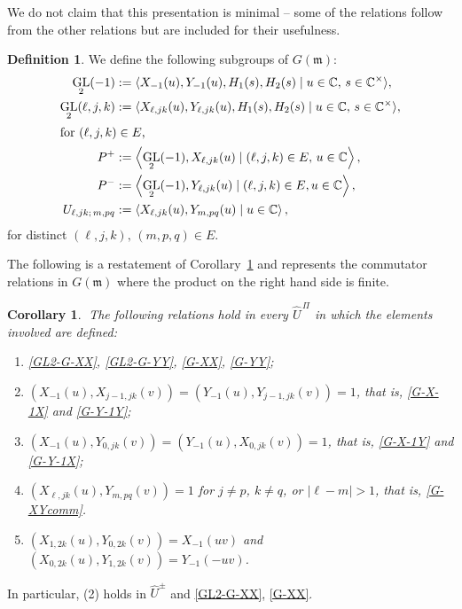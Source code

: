 \documentclass[11pt,letterpaper]{amsart}
\newcounter{thecounter}
\numberwithin{thecounter}{section}
\newtheorem{corollary}[thecounter]{Corollary}
\theoremstyle{definition}
\newtheorem{defn}[thecounter]{Definition}
\DeclareMathOperator{\GL}{GL}
\newcommand{\C}{{\mathbb C}}
\newcommand{\Pp}{{{P}^+}}
\newcommand{\Pm}{{{P}^-}}
\newcommand{\Uhpm}{{\widehat{U}^\pm}}
\newcommand{\m}{{\mathfrak{m}}}
\begin{document}
We do not claim that this presentation is  minimal -- some of the relations 
follow from the other relations but are included for their usefulness. 

\begin{defn}\label{subgps}  We define the following subgroups of $G(\m)$:
\begin{align*}
\GL_2(-1) &:= \langle X_{-1}(u), Y_{-1}(u), H_1(s), H_2(s)\mid u\in\C,\,s\in\C^\times\rangle,\\
\GL_2(\ell,j,k) &:= \langle X_{\ell,jk}(u), Y_{\ell,jk}(u), H_1(s), H_2(s)\mid u\in\C,\,s\in\C^\times\rangle,\\
\intertext{for $(\ell,j,k)\in E$,}
\Pp &:= \left\langle \GL_2(-1), X_{\ell,jk}(u) \mid (\ell,j,k)\in E,\,u\in\C\right\rangle,\\
\Pm &:= \left\langle \GL_2(-1), Y_{\ell,jk}(u) \mid  (\ell,j,k)\in E,u\in\C\right\rangle,\\
U_{\ell,jk;\,m,pq} &:= \left\langle X_{\ell,jk}(u), Y_{m,pq}(u) \mid u\in\C\right\rangle,
\end{align*}
for distinct $(\ell,j,k),\,(m,p,q)\in E$.
\end{defn}


The following is a restatement of Corollary~\ref{C-comm} and represents the commutator relations in $G(\mathfrak m)$ where the product on 
the right hand side is finite.
\begin{corollary} $\;$\label{C-comm}
The following relations hold in every $\widehat{U}^{\,\Pi}$ in which the elements involved are defined:
\begin{enumerate}
\item \eqref{GL2-G-XX},  \eqref{GL2-G-YY}, \eqref{G-XX}, \eqref{G-YY};
\item $\left(X_{-1}(u),X_{j-1,jk}(v)\right) = \left(Y_{-1}(u),Y_{j-1,jk}(v)\right) = 1$, that is, \eqref{G-X-1X} and \eqref{G-Y-1Y};
\item $\left(X_{-1}(u),Y_{0,jk}(v)\right) = \left(Y_{-1}(u),X_{0,jk}(v)\right) = 1$, that is, \eqref{G-X-1Y} and \eqref{G-Y-1X};
\item $\left(X_{\ell,jk}(u),Y_{m,pq}(v)\right) =1$ for $j\ne p$, $k\ne q$, or $\left|\ell-m\right|>1$, that is, \eqref{G-XYcomm}.
\item $\left(X_{1,2k}(u),Y_{0,2k}(v)\right)=X_{-1}(uv)$ and $\left(X_{0,2k}(u),Y_{1,2k}(v)\right)=Y_{-1}(-uv)$.
\end{enumerate}
\end{corollary}
In particular, (2) holds in $\Uhpm$ and \eqref{GL2-G-XX},  \eqref{G-XX}.
\end{document}
